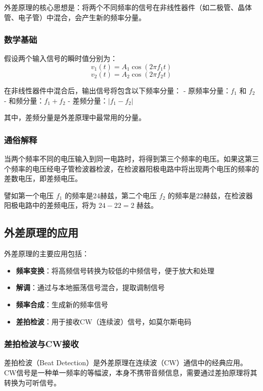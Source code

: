 外差原理的核心思想是：将两个不同频率的信号在非线性器件（如二极管、晶体管、电子管）中混合，会产生新的频率分量。

\subsubsection{数学基础}

假设两个输入信号的瞬时值分别为：
\[ v_1(t) = A_1 \cos(2\pi f_1 t) \]
\[ v_2(t) = A_2 \cos(2\pi f_2 t) \]

在非线性器件中混合后，输出信号将包含以下频率分量：
- 原频率分量：\( f_1 \) 和 \( f_2 \)
- 和频分量：\( f_1 + f_2 \)
- 差频分量：\( |f_1 - f_2| \)

其中，差频分量是外差原理中最常用的分量。

\subsubsection{通俗解释}

当两个频率不同的电压输入到同一电路时，将得到第三个频率的电压。如果这第三个频率的电压经电子管检波器检波，在检波器阳极电路中将出现两个电压的频率的差数电压，即差频电压。

譬如第一个电压 \( f_1 \) 的频率是24赫兹，第二个电压 \( f_2 \) 的频率是22赫兹，在检波器阳极电路中的差频电压，将为 \( 24 - 22 = 2 \) 赫兹。

\subsection{外差原理的应用}

外差原理的主要应用包括：

\begin{itemize}
    \item \textbf{频率变换}：将高频信号转换为较低的中频信号，便于放大和处理
    \item \textbf{解调}：通过与本地振荡信号混合，提取调制信号
    \item \textbf{频率合成}：生成新的频率信号
    \item \textbf{差拍检波}：用于接收CW（连续波）信号，如莫尔斯电码
\end{itemize}

\subsubsection{差拍检波与CW接收}

差拍检波（Beat Detection）是外差原理在连续波（CW）通信中的经典应用。CW信号是一种单一频率的等幅波，本身不携带音频信息，需要通过差拍原理将其转换为可听信号。

